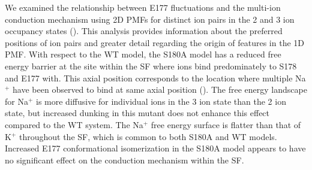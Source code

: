 \begin{refsection}
We examined the relationship between E177 fluctuations and the multi-ion conduction mechanism using 2D PMFs for distinct ion pairs in the 2 and 3 ion occupancy states (). This analysis provides information about the preferred positions of ion pairs and greater detail regarding the origin of features in the 1D PMF. With respect to the WT model, the S180A model has a reduced free energy barrier at the site within the SF where ions bind predominately to S178 and E177 with. This axial position corresponds to the location where multiple Na$^+$ have been observed to bind at same axial position (). The free energy landscape for Na$^+$ is more diffusive for individual ions in the 3 ion state than the 2 ion state, but increased dunking in this mutant does not enhance this effect compared to the WT system. The Na$^+$ free energy surface is flatter than that of K$^+$ throughout the SF, which is common to both S180A and WT models. Increased E177 conformational isomerization in the S180A model appears to have no significant effect on the conduction mechanism within the SF. 


\end{refsection}

